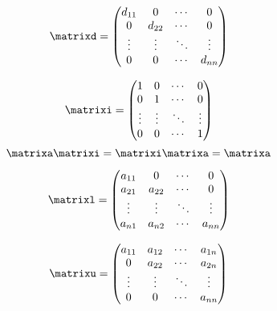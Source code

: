 \begin{defn}
  \begin{equation*}
    \matrixd
    =
    \begin{pmatrix}
      d_{11}  & 0       & \cdots & 0 \\
      0       & d_{22}  & \cdots & 0 \\
      \vdots  & \vdots  & \ddots & \vdots \\
      0       & 0       & \cdots & d_{nn} \\
    \end{pmatrix}
  \end{equation*}
\end{defn}
\begin{defn}
  \begin{equation*}
    \matrixi
    =
    \begin{pmatrix}
      1       & 0       & \cdots & 0 \\
      0       & 1       & \cdots & 0 \\
      \vdots  & \vdots  & \ddots & \vdots \\
      0       & 0       & \cdots & 1 \\
    \end{pmatrix}
  \end{equation*}
  \begin{equation*}
    \matrixa\matrixi = \matrixi\matrixa = \matrixa
  \end{equation*}
\end{defn}
\begin{defn}
  \begin{equation*}
    \matrixl
    =
    \begin{pmatrix}
      a_{11} & 0      & \cdots & 0 \\
      a_{21} & a_{22} & \cdots & 0 \\
      \vdots & \vdots & \ddots & \vdots \\
      a_{n1} & a_{n2} & \cdots & a_{nn} \\
    \end{pmatrix}
  \end{equation*}
\end{defn}
\begin{defn}
  \begin{equation*}
    \matrixu
    =
    \begin{pmatrix}
      a_{11} & a_{12} & \cdots & a_{1n} \\
      0      & a_{22} & \cdots & a_{2n} \\
      \vdots & \vdots & \ddots & \vdots \\
      0      & 0      & \cdots & a_{nn} \\
    \end{pmatrix}
  \end{equation*}
\end{defn}
